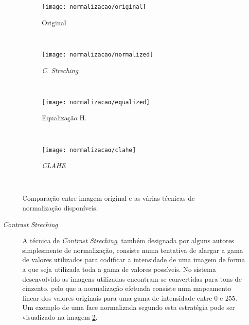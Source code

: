 \begin{figure}[t]
        \centering
        \begin{subfigure}[b]{0.2\textwidth}
                \centering
                \texttt{[image: normalizacao/original]}
                \caption{Original               }
                \label{fig:normalizacao-original}
        \end{subfigure}%
        ~
        \begin{subfigure}[b]{0.2\textwidth}
                \centering
                \texttt{[image: normalizacao/normalized]}
                \caption{\textit{C. Streching}}
                \label{fig:normalizacao-normalized}
        \end{subfigure}
        ~ 
        \begin{subfigure}[b]{0.2\textwidth}
                \centering
                \texttt{[image: normalizacao/equalized]}
                \caption{Equalização H.}
                \label{fig:normalizacao-equalized}
        \end{subfigure}
        ~
        \begin{subfigure}[b]{0.2\textwidth}
                \centering
                \texttt{[image: normalizacao/clahe]}
                \caption{\textit{CLAHE}}
                \label{fig:normalizacao-clahe}
        \end{subfigure}
        ~ 
        \caption{Comparação entre imagem original e as várias técnicas de normalização disponíveis.}\label{fig:normalizacao}
\end{figure}

\begin{description}
\item[\textit{Contrast Streching}]
A técnica de \textit{Contrast Streching}, também designada por alguns autores simplesmente de normalização, consiste numa tentativa de alargar a gama de valores utilizados para codificar a intensidade de uma imagem de forma a que seja utilizada toda a gama de valores possíveis. No sistema desenvolvido as imagens utilizadas encontram-se convertidas para tons de cinzento, pelo que a normalização efetuada consiste num mapeamento linear dos valores originais para uma gama de intensidade entre 0 e 255. Um exemplo de uma face normalizada segundo esta estratégia pode ser visualizado na imagem \ref{fig:normalizacao-normalized}.
\end{description}

